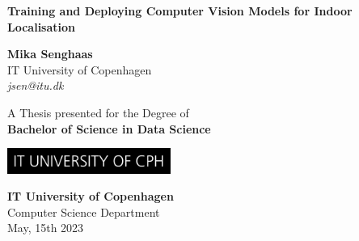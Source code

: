 \begin{titlepage}
  \begin{center}

    \vspace*{1cm}

    \textbf{\LARGE
    Training and Deploying Computer Vision Models for Indoor Localisation
    }

    \vspace{1.5cm}

    \textbf{Mika Senghaas} \\
    IT University of Copenhagen \\
    \textit{jsen@itu.dk}

    \vfill

    A Thesis presented for the Degree of \\
    \textbf{Bachelor of Science in Data Science}

    \vspace{0.8cm}

    \includegraphics[width=0.4\textwidth]{figures/itu.jpg}

    \vspace{0.8cm}

    \textbf{IT University of Copenhagen}\\
    Computer Science Department\\
    \vspace{.5cm}
    May, 15th 2023

  \end{center}
\end{titlepage}
